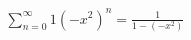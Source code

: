 \documentclass[preview]{standalone}
\begin{document}
\begin{align*}
\sum_{n=0}^{\infty} 1(-x^2)^n = \frac{1}{1-(-x^2)}
\end{align*}
\end{document}

